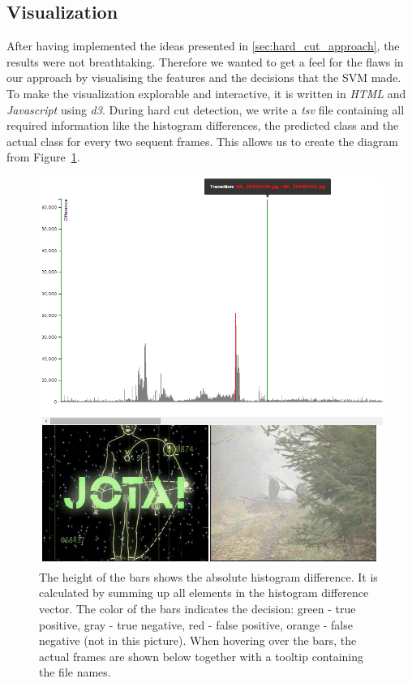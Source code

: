 \subsection{Visualization}
\label{sec:hard_cut_visualization}

After having implemented the ideas presented in \ref{sec:hard_cut_approach}, the results were not breathtaking. 
Therefore we wanted to get a feel for the flaws in our approach by visualising the features and the decisions that the SVM made.
To make the visualization explorable and interactive, it is written in \emph{HTML} and \emph{Javascript} using \emph{d3}.
During hard cut detection, we write a \emph{tsv} file containing all required information like the histogram differences, the predicted class and the actual class for every two sequent frames.
This allows us to create the diagram from Figure~\ref{fig:hard_cut_visualization}.

\begin{figure}
	\centering
	\includegraphics[scale=.7]{images/hard_cut_visualization.png}
	\caption{The height of the bars shows the absolute histogram difference. It is calculated by summing up all elements in the histogram difference vector. The color of the bars indicates the decision: green - true positive, gray - true negative, red - false positive, orange - false negative (not in this picture). When hovering over the bars, the actual frames are shown below together with a tooltip containing the file names.}
	\label{fig:hard_cut_visualization}
\end{figure}


